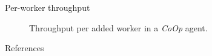 \documentclass[aspectratio=169,xcolor={dvipsnames}
,handout
]{beamer}
\newcommand{\Coopfw}{\emph{CoOp}}
\begin{document}
\begin{frame}{Per-worker throughput}
	\begin{figure}
		\caption{Throughput per added worker in a \Coopfw{} agent.\label{fig:tput-per-core}}
	\end{figure}
\end{frame}

\begin{frame}[allowframebreaks]{References}
	\printbibliography[heading=none]
\end{frame}
\end{document}
